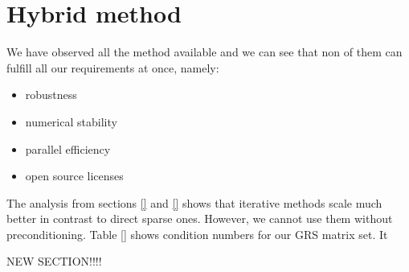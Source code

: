 \section{Hybrid method}
\label{subseq:choice-and-motivation}

We have observed all the method available and we can see that non of them can fulfill all our requirements at once, namely:

\begin{itemize}
	\item robustness
	\item numerical stability
	\item parallel efficiency
	\item open source licenses
\end{itemize}

The analysis from sections \ref{} and \ref{} shows that iterative methods scale much better in contrast to direct sparse ones. However, we cannot use them without preconditioning. Table \ref{} shows condition numbers for our GRS matrix set. It 


NEW SECTION!!!!



\newpage
